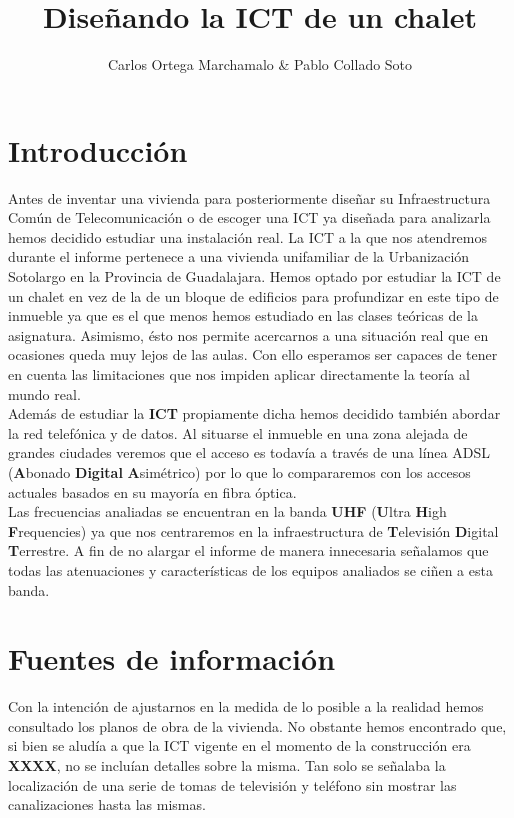 \documentclass{article}[12 pt]
\title{Diseñando la ICT de un chalet}
\author{Carlos Ortega Marchamalo \& Pablo Collado Soto}
\date{}
\begin{document}
	\maketitle

	\section{Introducción}
		Antes de inventar una vivienda para posteriormente diseñar su Infraestructura Común de Telecomunicación o de escoger una ICT ya diseñada para analizarla hemos decidido estudiar una instalación real. La ICT a la que nos atendremos durante el informe pertenece a una vivienda unifamiliar de la Urbanización Sotolargo en la Provincia de Guadalajara. Hemos optado por estudiar la ICT de un chalet en vez de la de un bloque de edificios para profundizar en este tipo de inmueble ya que es el que menos hemos estudiado en las clases teóricas de la asignatura. Asimismo, ésto nos permite acercarnos a una situación real que en ocasiones queda muy lejos de las aulas. Con ello esperamos ser capaces de tener en cuenta las limitaciones que nos impiden aplicar directamente la teoría al mundo real.\\

		Además de estudiar la \textbf{ICT} propiamente dicha hemos decidido también abordar la red telefónica y de datos. Al situarse el inmueble en una zona alejada de grandes ciudades veremos que el acceso es todavía a través de una línea ADSL (\textbf{A}bonado \textbf{Digital} \textbf{A}simétrico) por lo que lo compararemos con los accesos actuales basados en su mayoría en fibra óptica.\\

		Las frecuencias analiadas se encuentran en la banda \textbf{UHF} (\textbf{U}ltra \textbf{H}igh \textbf{F}requencies) ya que nos centraremos en la infraestructura de \textbf{T}elevisión \textbf{D}igital \textbf{T}errestre. A fin de no alargar el informe de manera innecesaria señalamos que todas las atenuaciones y características de los equipos analiados se ciñen a esta banda.\\

	\section{Fuentes de información}
		Con la intención de ajustarnos en la medida de lo posible a la realidad hemos consultado los planos de obra de la vivienda. No obstante hemos encontrado que, si bien se aludía a que la ICT vigente en el momento de la construcción era \textbf{XXXX}, no se incluían detalles sobre la misma. Tan solo se señalaba la localización de una serie de tomas de televisión y teléfono sin mostrar las canalizaciones hasta las mismas.\\
\end{document}
